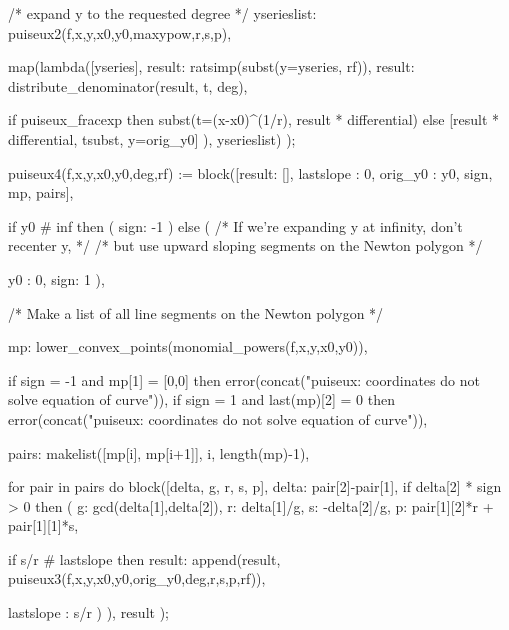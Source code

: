 \begin{maximacommontiny}
   /* expand y to the requested degree */
   yserieslist: puiseux2(f,x,y,x0,y0,maxypow,r,s,p),

   map(lambda([yseries],
      result: ratsimp(subst(y=yseries, rf)),
      result: distribute_denominator(result, t, deg),

      if puiseux_fracexp then
         subst(t=(x-x0)^(1/r), result * differential)
      else
         [result * differential, tsubst, y=orig_y0]
   ), yserieslist)
 );
\end{maximacommontiny}

\begin{maximacommonsmall}
puiseux4(f,x,y,x0,y0,deg,rf) :=
 block([result: [], lastslope : 0, orig_y0 : y0, sign, mp, pairs],

   if y0 # inf then (
      sign: -1
   ) else (
      /* If we're expanding y at infinity, don't recenter y, */
      /* but use upward sloping segments on the Newton polygon */

      y0 : 0,
      sign: 1
   ),

   /* Make a list of all line segments on the Newton polygon */

   mp: lower_convex_points(monomial_powers(f,x,y,x0,y0)),

   if sign = -1 and mp[1] = [0,0] then
      error(concat("puiseux: coordinates do not solve equation of curve")),
   if sign = 1 and last(mp)[2] = 0 then
      error(concat("puiseux: coordinates do not solve equation of curve")),

   pairs: makelist([mp[i], mp[i+1]], i, length(mp)-1),

   for pair in pairs do block([delta, g, r, s, p],
     delta: pair[2]-pair[1],
     if delta[2] * sign > 0 then (
       g: gcd(delta[1],delta[2]),
       r: delta[1]/g,
       s: -delta[2]/g,
       p: pair[1][2]*r + pair[1][1]*s,

       if s/r # lastslope then
          result: append(result, puiseux3(f,x,y,x0,y0,orig_y0,deg,r,s,p,rf)),

       lastslope : s/r
     )
   ),
   result
 );

\end{maximacommonsmall}

